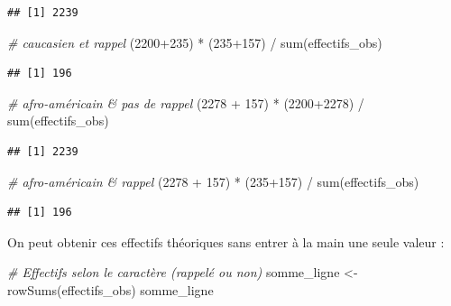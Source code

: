 \documentclass[
  11pt,
]{book}
\newenvironment{Shaded}{\begin{snugshade}}{\end{snugshade}}
\newcommand{\CommentTok}[1]{\textcolor[rgb]{0.56,0.35,0.01}{\textit{#1}}}
\newcommand{\DecValTok}[1]{\textcolor[rgb]{0.00,0.00,0.81}{#1}}
\newcommand{\FunctionTok}[1]{\textcolor[rgb]{0.00,0.00,0.00}{#1}}
\newcommand{\NormalTok}[1]{#1}
\newcommand{\OtherTok}[1]{\textcolor[rgb]{0.56,0.35,0.01}{#1}}
\newcommand{\SpecialCharTok}[1]{\textcolor[rgb]{0.00,0.00,0.00}{#1}}
\numberwithin{equation}{section}
\numberwithin{countremarque}{section}
\begin{document}
\begin{lstlisting}
## [1] 2239
\end{lstlisting}

\begin{Shaded}
\begin{Highlighting}[]
\CommentTok{\# caucasien et rappel}
\NormalTok{(}\DecValTok{2200}\SpecialCharTok{+}\DecValTok{235}\NormalTok{) }\SpecialCharTok{*}\NormalTok{ (}\DecValTok{235}\SpecialCharTok{+}\DecValTok{157}\NormalTok{) }\SpecialCharTok{/} \FunctionTok{sum}\NormalTok{(effectifs\_obs)}
\end{Highlighting}
\end{Shaded}

\begin{lstlisting}
## [1] 196
\end{lstlisting}

\begin{Shaded}
\begin{Highlighting}[]
\CommentTok{\# afro{-}américain \& pas de rappel}
\NormalTok{(}\DecValTok{2278} \SpecialCharTok{+} \DecValTok{157}\NormalTok{) }\SpecialCharTok{*}\NormalTok{ (}\DecValTok{2200}\SpecialCharTok{+}\DecValTok{2278}\NormalTok{) }\SpecialCharTok{/} \FunctionTok{sum}\NormalTok{(effectifs\_obs)}
\end{Highlighting}
\end{Shaded}

\begin{lstlisting}
## [1] 2239
\end{lstlisting}

\begin{Shaded}
\begin{Highlighting}[]
\CommentTok{\# afro{-}américain \& rappel}
\NormalTok{(}\DecValTok{2278} \SpecialCharTok{+} \DecValTok{157}\NormalTok{) }\SpecialCharTok{*}\NormalTok{ (}\DecValTok{235}\SpecialCharTok{+}\DecValTok{157}\NormalTok{) }\SpecialCharTok{/} \FunctionTok{sum}\NormalTok{(effectifs\_obs)}
\end{Highlighting}
\end{Shaded}

\begin{lstlisting}
## [1] 196
\end{lstlisting}

On peut obtenir ces effectifs théoriques sans entrer à la main une seule valeur :

\begin{Shaded}
\begin{Highlighting}[]
\CommentTok{\# Effectifs selon le caractère (rappelé ou non)}
\NormalTok{somme\_ligne }\OtherTok{\textless{}{-}} \FunctionTok{rowSums}\NormalTok{(effectifs\_obs)}
\NormalTok{somme\_ligne}
\end{Highlighting}
\end{Shaded}
\end{document}
